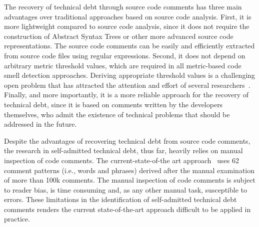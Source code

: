 \documentclass[10pt,journal,compsoc]{IEEEtran}
\newcommand{\emad}[1]{\textcolor{red}{{\it [Emad: #1]}}}
\newcommand{\SATD}{self-admitted technical debt\xspace}
\begin{document}
The recovery of technical debt through source code comments has three main advantages over traditional approaches based on source code analysis. First, it is more lightweight compared to source code analysis, since it does not require the construction of Abstract Syntax Trees or other more advanced source code representations. The source code comments can be easily and efficiently extracted from source code files using regular expressions.
Second, it does not depend on arbitrary metric threshold values, which are required in all metric-based code smell detection approaches.
Deriving appropriate threshold values is a challenging open problem that has attracted the attention and effort of several researchers~\cite{Oliveira2014CSMR,Fontana2015WETSoM,Fontana2015EMSE}.
Finally, and more importantly, it is a more reliable approach for the recovery of technical debt, since it is based on comments written by the developers themselves, who admit the existence of technical problems that should be addressed in the future.

Despite the advantages of recovering technical debt from source code comments, the research in \SATD, thus far, heavily relies on manual inspection of code comments. The current-state-of-the art approach~\cite{Potdar2014ICSME} uses 62 comment patterns (i.e., words and phrases) derived after the manual examination of more than 100k comments. The manual inspection of code comments is subject to reader bias, is time consuming and, as any other manual task, susceptible to errors. These limitations in the identification of \SATD comments renders the current state-of-the-art approach difficult to be applied in practice.
\end{document}
